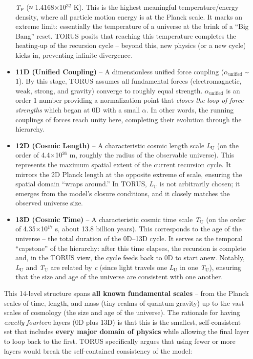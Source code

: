 \documentclass[]{article}
\newcommand{\subscript}[1]{\ensuremath{_{\mathrm{#1}}}}
\newcommand{\superscript}[1]{\ensuremath{^{\mathrm{#1}}}}
\begin{document}
\begin{itemize}
  \emph{T\subscript{P}} (≈
  1.4168×10\superscript{32} K)​. This is the highest meaningful temperature/energy
  density, where all particle motion energy is at the Planck scale. It
  marks an extreme limit: essentially the temperature of a universe at
  the brink of a ``Big Bang'' reset. TORUS posits that reaching this
  temperature completes the heating-up of the recursion cycle​ -- beyond
  this, new physics (or a new cycle) kicks in, preventing infinite
  divergence.
\item
  \textbf{11D (Unified Coupling)} -- A dimensionless unified force
  coupling
  ($\alpha_\text{unified}$
  \textasciitilde{} 1)​. By this stage, TORUS assumes all fundamental
  forces (electromagnetic, weak, strong, and gravity) converge to
  roughly equal strength.
  $\alpha_\text{unified}$ is
  an order-1 number providing a normalization point that \emph{closes
  the loop of force strengths} which began at 0D with a small $\alpha$. In
  other words, the running couplings of forces reach unity here,
  completing their evolution through the hierarchy​.
\item
  \textbf{12D (Cosmic Length)} -- A characteristic cosmic length scale
  \emph{L\subscript{U}} (on
  the order of 4.4×10\superscript{26} m, roughly the radius of the observable
  universe)​. This represents the maximum spatial extent of the current
  recursion cycle. It mirrors the 2D Planck length at the opposite
  extreme of scale, ensuring the spatial domain ``wraps around.'' In
  TORUS,
  \emph{L\subscript{U}} is
  not arbitrarily chosen; it emerges from the model's closure
  conditions, and it closely matches the observed universe size.
\item
  \textbf{13D (Cosmic Time)} -- A characteristic cosmic time scale
  \emph{T\subscript{U}} (on
  the order of 4.35×10\superscript{17} s, about 13.8 billion years)​. This
  corresponds to the age of the universe -- the total duration of the
  0D--13D cycle. It serves as the temporal ``capstone'' of the
  hierarchy: after this time elapses, the recursion is complete and, in
  the TORUS view, the cycle feeds back to 0D to start anew. Notably,
  \emph{L\subscript{U}} and
  \emph{T\subscript{U}} are
  related by \emph{c} (since light travels one
  \emph{L\subscript{U}} in
  one
  \emph{T\subscript{U}}),
  ensuring that the size and age of the universe are consistent with one
  another​.
\end{itemize}

This 14-level structure spans \textbf{all known fundamental scales} --
from the Planck scales of time, length, and mass (tiny realms of quantum
gravity) up to the vast scales of cosmology (the size and age of the
universe)​. The rationale for having \emph{exactly fourteen} layers (0D
plus 13D) is that this is the smallest, self-consistent set that
includes \textbf{every major domain of physics} while allowing the final
layer to loop back to the first. TORUS specifically argues that using
fewer or more layers would break the self-contained consistency of the
model:
\end{document}

